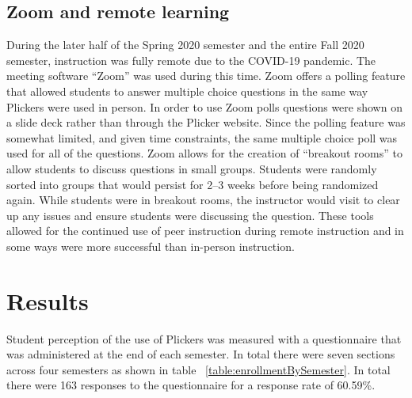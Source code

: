 \documentclass[12pt]{article}
\newcommand\sampleSize{163}
\begin{document}
\subsection{Zoom and remote learning}
During the later half of the Spring 2020 semester and the entire Fall 2020 semester, instruction was fully remote due to the COVID-19 pandemic. The meeting software ``Zoom''  was used during this time. Zoom offers a polling feature that allowed students to answer multiple choice questions in the same way Plickers were used in person. In order to use Zoom polls questions were shown on a slide deck rather than through the Plicker website. Since the polling feature was somewhat limited, and given time constraints, the same multiple choice poll was used for all of the questions. 
Zoom allows for the creation of ``breakout rooms'' to allow students to discuss questions in small groups. Students were randomly sorted into groups that would persist for 2–3 weeks before being randomized again. While students were in breakout rooms, the instructor would visit to clear up any issues and ensure students were discussing the question. These tools allowed for the continued use of peer instruction during remote instruction and in some ways were more successful than in-person instruction.

\section{Results}

Student perception of the use of Plickers was measured with a questionnaire that was administered at the end of each semester. In total there were seven sections across four semesters as shown in table ~\ref{table:enrollmentBySemester}. In total there were \sampleSize{}  responses to the questionnaire for a response rate of 60.59\%.
\end{document}
